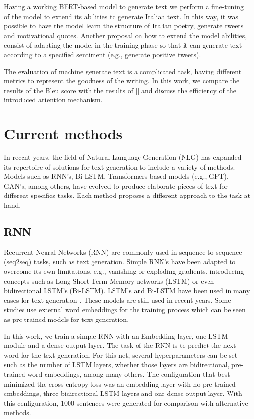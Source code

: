 \documentclass[10pt,twocolumn,letterpaper]{article}
\begin{document}
Having a working BERT-based model to generate text we perform a fine-tuning of the model
to extend its abilities to generate Italian text. In this way, it was possible to have the
model learn the structure of Italian poetry, generate tweets and motivational quotes.
Another proposal on how to extend the model abilities, consist of adapting the model in
the training phase so that it can generate text according to a specified sentiment
(e.g., generate positive tweets).

The evaluation of machine generate text is a complicated task, having different metrics
to represent the goodness of the writing. In this work, we compare the results of the Bleu
score with the results of [] and discuss the efficiency of the introduced attention
mechanism.

\section{Current methods}

In recent years, the field of Natural Language Generation (NLG) has expanded its repertoire
of solutions for text generation to include a variety of methods.
Models such as RNN's, Bi-LSTM, Transformers-based models (e.g., GPT), GAN's, among others, have evolved
to produce elaborate pieces of text for different specifics tasks.
Each method proposes a different approach to the task at hand.

\subsection{RNN}

Recurrent Neural Networks (RNN) are commonly used in sequence-to-sequence (seq2seq) tasks, such as text generation.
Simple RNN's have been adapted to overcome its own limitations, e.g., vanishing or exploding gradients,
introducing concepts such as Long Short Term Memory networks (LSTM) or even bidirectional LSTM's (Bi-LSTM).
LSTM's and Bi-LSTM have been used in many cases for text generation \cite{Bengali} \cite{lstm1} \cite{lstm2} \cite{lstm3}.
These models are still used in recent years.
Some studies \cite{embedds} use external word embeddings for the training process which can be seen as pre-trained
models for text generation.

In this work, we train a simple RNN with an Embedding layer, one LSTM module and a dense output layer.
The task of the RNN is to predict the next word for the text generation.
For this net, several hyperparameters can be set such as the number of LSTM layers, whether those layers
are bidirectional, pre-trained word embeddings, among many others.
The configuration that best minimized the cross-entropy loss was an embedding layer with no pre-trained embeddings,
three bidirectional LSTM layers and one dense output layer.
With this configuration, 1000 sentences were generated for comparison with alternative methods.
\end{document}
